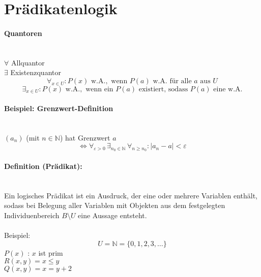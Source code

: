 %
\section{Pr\"adikatenlogik}
\paragraph{Quantoren}
\ \\$ \forall $ Allquantor \\
$ \exists $ Existenzquantor \\

\[
\forall_{x\in U}:P(x) \text{ w.A.},\text{ wenn }P(a) \text{ w.A. f\"ur alle } a \text{ aus } U
\]
\[
\exists_{x\in U}:P(x) \text{ w.A.},\text{ wenn ein }P(a) \text{ existiert, sodass } P(a) \text{ eine w.A.}
\]

\paragraph{Beispiel: Grenzwert-Definition}
\ \\
$(a_n)$ (mit $n\in \mathbb{N}$) hat Grenzwert $a$
\[
\Leftrightarrow \forall_{\varepsilon > 0} \, \exists_{n_0 \in \mathbb{N}} \, \forall_{n \geq n_0}: |a_n - a| < \varepsilon
\]

\paragraph{Definition (Pr\"adikat):}
\ \\
\glqq Ein logisches Pr\"adikat ist ein Ausdruck, der eine oder mehrere Variablen enth\"alt, sodass bei Belegung aller Variablen mit Objekten aus dem festgelegten Individuenbereich $B\setminus U$ eine Aussage entsteht.\grqq \\
\ \\
Beispiel:\\
\[
U=\mathbb{N}=\{0,1,2,3,\ldots\}
\]
$P(x)$ : \glq $x$ ist prim\grq \\
$R(x,y) = $\glq$x \leq y$\grq \\
$Q(x,y) = $\glq$x=y+2$\grq


